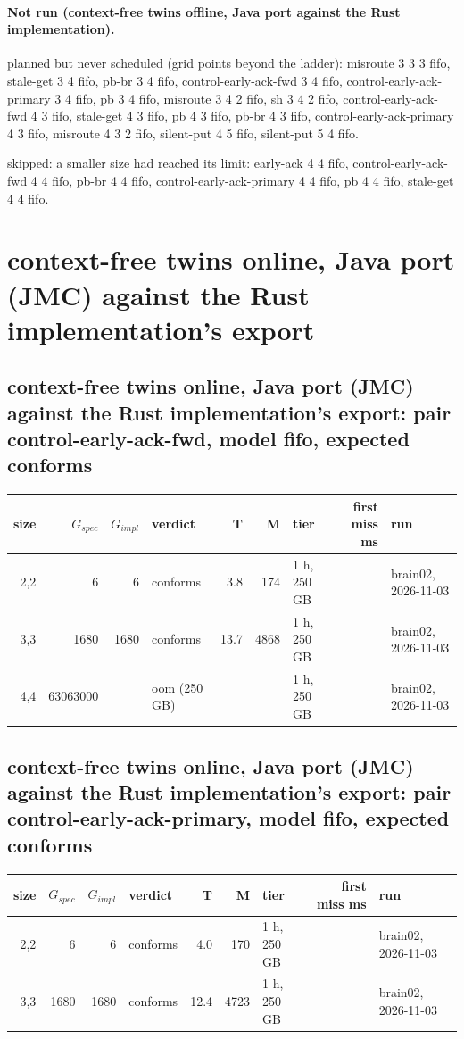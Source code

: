 \documentclass[10pt]{article}
\begin{document}
\paragraph{Not run (context-free twins offline, Java port against the Rust implementation).}
planned but never scheduled (grid points beyond the ladder): misroute 3 3 3 fifo, stale-get 3 4 fifo, pb-br 3 4 fifo, control-early-ack-fwd 3 4 fifo, control-early-ack-primary 3 4 fifo, pb 3 4 fifo, misroute 3 4 2 fifo, sh 3 4 2 fifo, control-early-ack-fwd 4 3 fifo, stale-get 4 3 fifo, pb 4 3 fifo, pb-br 4 3 fifo, control-early-ack-primary 4 3 fifo, misroute 4 3 2 fifo, silent-put 4 5 fifo, silent-put 5 4 fifo.\par
skipped: a smaller size had reached its limit: early-ack 4 4 fifo, control-early-ack-fwd 4 4 fifo, pb-br 4 4 fifo, control-early-ack-primary 4 4 fifo, pb 4 4 fifo, stale-get 4 4 fifo.\par
\section*{context-free twins online, Java port (JMC) against the Rust implementation's export}
\subsection*{context-free twins online, Java port (JMC) against the Rust implementation's export: pair \textsf{control-early-ack-fwd}, model fifo, expected conforms}
\begin{longtable}{@{}rrrlrrlrl@{}}
\toprule
size & $G_{\mathit{spec}}$ & $G_{\mathit{impl}}$ & verdict & T & M & tier & first miss ms & run \\
\midrule
\endhead
\color{red} 2,2 & 6 & 6 & conforms & 3.8 & 174 & 1 h, 250 GB &  & brain02, 2026-11-03 \\
\color{red} 3,3 & 1680 & 1680 & conforms & 13.7 & 4868 & 1 h, 250 GB &  & brain02, 2026-11-03 \\
\color{red} 4,4 & 63063000 &  & oom (250 GB) &  &  & 1 h, 250 GB &  & brain02, 2026-11-03 \\
\bottomrule
\end{longtable}
\subsection*{context-free twins online, Java port (JMC) against the Rust implementation's export: pair \textsf{control-early-ack-primary}, model fifo, expected conforms}
\begin{longtable}{@{}rrrlrrlrl@{}}
\toprule
size & $G_{\mathit{spec}}$ & $G_{\mathit{impl}}$ & verdict & T & M & tier & first miss ms & run \\
\midrule
\endhead
\color{red} 2,2 & 6 & 6 & conforms & 4.0 & 170 & 1 h, 250 GB &  & brain02, 2026-11-03 \\
\color{red} 3,3 & 1680 & 1680 & conforms & 12.4 & 4723 & 1 h, 250 GB &  & brain02, 2026-11-03 \\
\bottomrule
\end{longtable}
\end{document}
